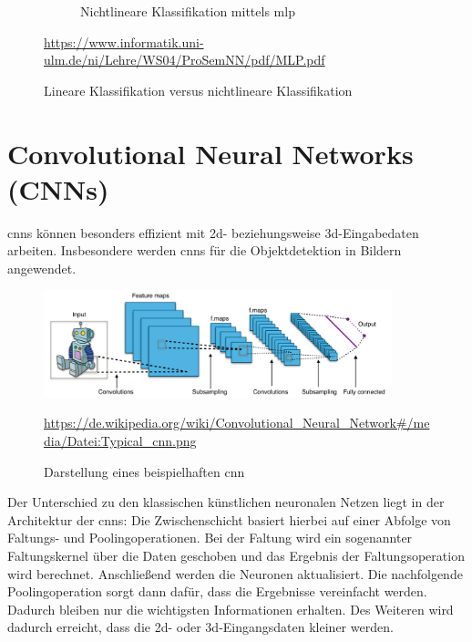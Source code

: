 \begin{figure}[H]
\begin{subfigure}[b]{0.3\textwidth}
		\caption{Nichtlineare Klassifikation mittels \acs{mlp}}
		\label{non-linear-classification}
	\end{subfigure}
	\caption{Lineare Klassifikation versus nichtlineare Klassifikation}
	\quelle\url{https://www.informatik.uni-ulm.de/ni/Lehre/WS04/ProSemNN/pdf/MLP.pdf}
\end{figure}

\section{Convolutional Neural Networks (CNNs)}

	\acf{cnns} können besonders effizient mit \acs{2d}- beziehungsweise \acs{3d}-Eingabedaten arbeiten. Insbesondere werden \acs{cnns} für die Objektdetektion in Bildern angewendet. \cite{datasolut4} \\
	
	\begin{figure}[H]
		\centering
		\includegraphics[width=0.9\textwidth]{kapitel3/images/cnn.png}
		\caption{Darstellung eines beispielhaften \acs{cnn}}
		\vspace{0.2cm}
		\quelle\url{https://de.wikipedia.org/wiki/Convolutional_Neural_Network#/media/Datei:Typical_cnn.png}
	\end{figure}

	Der Unterschied zu den klassischen künstlichen neuronalen Netzen liegt in der Architektur der \acs{cnns}: Die Zwischenschicht basiert hierbei auf einer Abfolge von Faltungs- und Poolingoperationen. Bei der Faltung wird ein sogenannter Faltungskernel über die Daten geschoben und das Ergebnis der Faltungsoperation wird berechnet. Anschließend werden die Neuronen aktualisiert. Die nachfolgende Poolingoperation sorgt dann dafür, dass die Ergebnisse vereinfacht werden. Dadurch bleiben nur die wichtigsten Informationen erhalten.	Des Weiteren wird dadurch erreicht, dass die \acs{2d}- oder \acs{3d}-Eingangsdaten kleiner werden. \cite{datasolut4}




